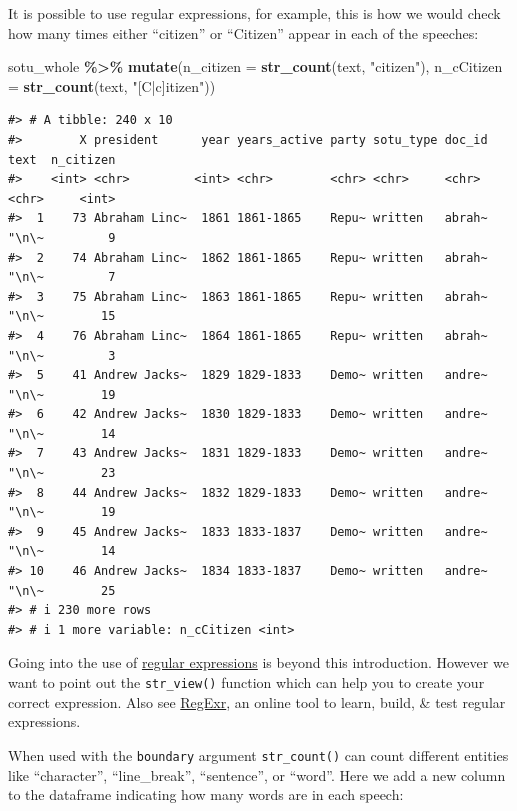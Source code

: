 \documentclass[
]{book}
\newenvironment{Shaded}{\begin{snugshade}}{\end{snugshade}}
\newcommand{\AttributeTok}[1]{\textcolor[rgb]{0.13,0.29,0.53}{#1}}
\newcommand{\FunctionTok}[1]{\textcolor[rgb]{0.13,0.29,0.53}{\textbf{#1}}}
\newcommand{\NormalTok}[1]{#1}
\newcommand{\SpecialCharTok}[1]{\textcolor[rgb]{0.81,0.36,0.00}{\textbf{#1}}}
\newcommand{\StringTok}[1]{\textcolor[rgb]{0.31,0.60,0.02}{#1}}
\begin{document}
It is possible to use regular expressions, for example, this is how we would check how many times either ``citizen'' or ``Citizen'' appear in each of the speeches:

\begin{Shaded}
\begin{Highlighting}[]
\NormalTok{sotu\_whole }\SpecialCharTok{\%\textgreater{}\%} 
    \FunctionTok{mutate}\NormalTok{(}\AttributeTok{n\_citizen =} \FunctionTok{str\_count}\NormalTok{(text, }\StringTok{"citizen"}\NormalTok{),}
           \AttributeTok{n\_cCitizen =} \FunctionTok{str\_count}\NormalTok{(text, }\StringTok{"[C|c]itizen"}\NormalTok{)) }
\end{Highlighting}
\end{Shaded}

\begin{verbatim}
#> # A tibble: 240 x 10
#>        X president      year years_active party sotu_type doc_id text  n_citizen
#>    <int> <chr>         <int> <chr>        <chr> <chr>     <chr>  <chr>     <int>
#>  1    73 Abraham Linc~  1861 1861-1865    Repu~ written   abrah~ "\n\~         9
#>  2    74 Abraham Linc~  1862 1861-1865    Repu~ written   abrah~ "\n\~         7
#>  3    75 Abraham Linc~  1863 1861-1865    Repu~ written   abrah~ "\n\~        15
#>  4    76 Abraham Linc~  1864 1861-1865    Repu~ written   abrah~ "\n\~         3
#>  5    41 Andrew Jacks~  1829 1829-1833    Demo~ written   andre~ "\n\~        19
#>  6    42 Andrew Jacks~  1830 1829-1833    Demo~ written   andre~ "\n\~        14
#>  7    43 Andrew Jacks~  1831 1829-1833    Demo~ written   andre~ "\n\~        23
#>  8    44 Andrew Jacks~  1832 1829-1833    Demo~ written   andre~ "\n\~        19
#>  9    45 Andrew Jacks~  1833 1833-1837    Demo~ written   andre~ "\n\~        14
#> 10    46 Andrew Jacks~  1834 1833-1837    Demo~ written   andre~ "\n\~        25
#> # i 230 more rows
#> # i 1 more variable: n_cCitizen <int>
\end{verbatim}

Going into the use of \href{https://en.wikipedia.org/wiki/Regular_expression}{regular expressions} is beyond this introduction. However we want to point out the \texttt{str\_view()} function which can help you to create your correct expression. Also see \href{https://regexr.com/}{RegExr}, an online tool to learn, build, \& test regular expressions.

When used with the \texttt{boundary} argument \texttt{str\_count()} can count different entities like ``character'', ``line\_break'', ``sentence'', or ``word''. Here we add a new column to the dataframe indicating how many words are in each speech:
\end{document}

